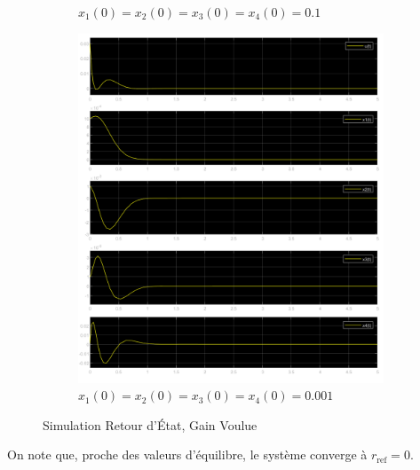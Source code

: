 \documentclass[class=article, crop=false]{standalone}
\begin{document}
\begin{resolution}
\begin{figure}[H]
\begin{subfigure}[b]{0.475\textwidth}
            \caption{$x_1(0) = x_2(0) = x_3(0) = x_4(0) = 0.1$}
        \end{subfigure}
        \begin{subfigure}[b]{0.475\textwidth}
            \centering
            \includegraphics[width=\textwidth]{../images/simulink_scope3_0_001.png}
            \caption{$x_1(0) = x_2(0) = x_3(0) = x_4(0) = 0.001$}
        \end{subfigure}
        \caption{Simulation Retour d'État, Gain Voulue}
    \end{figure}
    On note que, proche des valeurs d'équilibre, le système converge à $r_{\text{ref}} = 0$.
\end{resolution}

\newpage
\end{document}
